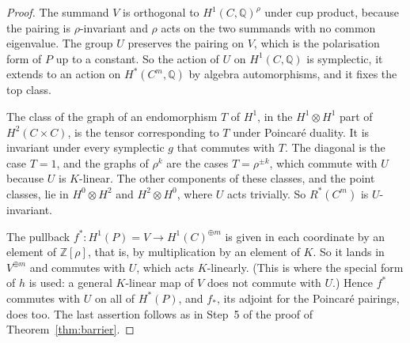 \documentclass[11pt]{amsart}
\theoremstyle{definition}
\theoremstyle{remark}
\newcommand{\QQ}{\mathbb{Q}}
\newcommand{\ZZ}{\mathbb{Z}}
\begin{document}
\begin{proof}
The summand $V$ is orthogonal to $H^{1}(C,\QQ)^{\rho}$ under cup product,
because the pairing is $\rho$-invariant and $\rho$ acts on the two summands
with no common eigenvalue. The group $U$ preserves the pairing on $V$, which
is the polarisation form of $P$ up to a constant. So the action of $U$ on
$H^{1}(C,\QQ)$ is symplectic, it extends to an action on $H^{*}(C^{m},\QQ)$
by algebra automorphisms, and it fixes the top class.

The class of the graph of an endomorphism $T$ of $H^{1}$, in the
$H^{1}\otimes H^{1}$ part of $H^{2}(C\times C)$, is the tensor
corresponding to $T$ under Poincar\'e duality. It is invariant under every
symplectic $g$ that commutes with $T$. The diagonal is the case $T=1$, and
the graphs of $\rho^{k}$ are the cases $T=\rho^{\pm k}$, which commute with
$U$ because $U$ is $K$-linear. The other components of these classes, and
the point classes, lie in $H^{0}\otimes H^{2}$ and $H^{2}\otimes H^{0}$,
where $U$ acts trivially. So $R^{*}(C^{m})$ is $U$-invariant.

The pullback $f^{*}\colon H^{1}(P)=V\to H^{1}(C)^{\oplus m}$ is given in
each coordinate by an element of $\ZZ[\rho]$, that is, by multiplication by
an element of $K$. So it lands in $V^{\oplus m}$ and commutes with $U$,
which acts $K$-linearly. (This is where the special form of $h$ is used: a
general $K$-linear map of $V$ does not commute with $U$.) Hence $f^{*}$ commutes
with $U$ on all of $H^{*}(P)$, and $f_{*}$, its adjoint for the Poincar\'e
pairings, does too. The last assertion follows as in Step~5 of the proof
of Theorem~\ref{thm:barrier}.
\end{proof}
\end{document}
